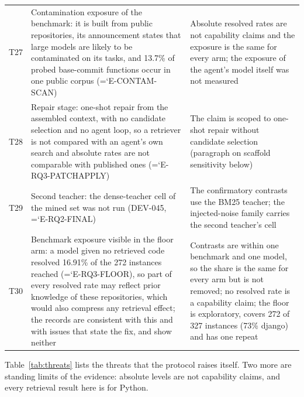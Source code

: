 \documentclass[10pt,twocolumn]{article}
\newcommand{\entry}[1]{{\ttfamily\hyphenchar\font=`\-\relax #1}}
\begin{document}
\begin{table}[t]
\begin{tabular}{@{}p{}p{}p{}@{}}
T27 & Contamination exposure of the benchmark: it is built from public repositories, its announcement states that large models are likely to be contaminated on its tasks, and 13.7\% of probed base-commit functions occur in one public corpus (\entry{E-CONTAM-SCAN}) & Absolute resolved rates are not capability claims and the exposure is the same for every arm; the exposure of the agent's model itself was not measured \\
T28 & Repair stage: one-shot repair from the assembled context, with no candidate selection and no agent loop, so a retriever is not compared with an agent's own search and absolute rates are not comparable with published ones (\entry{E-RQ3-PATCHAPPLY}) & The claim is scoped to one-shot repair without candidate selection (paragraph on scaffold sensitivity below) \\
T29 & Second teacher: the dense-teacher cell of the mined set was not run (DEV-045, \entry{E-RQ2-FINAL}) & The confirmatory contrasts use the BM25 teacher; the injected-noise family carries the second teacher's cell \\
T30 & Benchmark exposure visible in the floor arm: a model given no retrieved code resolved 16.91\% of the 272 instances reached (\entry{E-RQ3-FLOOR}), so part of every resolved rate may reflect prior knowledge of these repositories, which would also compress any retrieval effect; the records are consistent with this and with issues that state the fix, and show neither & Contrasts are within one benchmark and one model, so the share is the same for every arm but is not removed; no resolved rate is a capability claim; the floor is exploratory, covers 272 of 327 instances (73\% django) and has one repeat \\
\bottomrule
\end{tabular}
\end{table}

Table~\ref{tab:threats} lists the threats that the protocol raises itself. Two more are standing
limits of the evidence: absolute levels are not capability claims, and every retrieval result here
is for Python.
\end{document}
